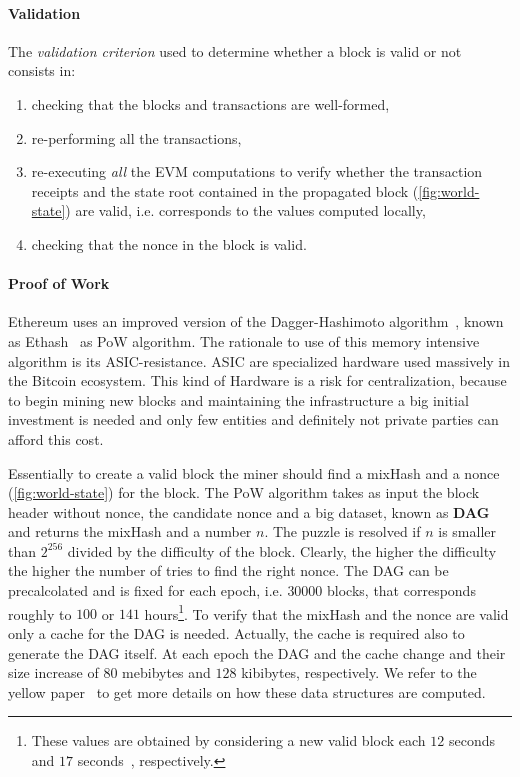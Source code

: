 \paragraph{Validation}
The \emph{validation criterion} used to determine whether a block is valid or
not consists in:
\begin{enumerate}
    \item checking that the blocks and transactions are well-formed,
    \item re-performing all the transactions,
    \item re-executing \emph{all} the EVM computations to verify whether the
    transaction receipts and the state root contained in the propagated block
    (\autoref{fig:world-state}) are valid, i.e. corresponds to the values
    computed locally,
    \item checking that the nonce in the block is valid.
\end{enumerate}

\paragraph{Proof of Work}
Ethereum uses an improved version of the
Dagger-Hashimoto algorithm~\cite{bib:dagger-hashimoto}, known as
Ethash~\cite[Appendix J]{wood2018ethereum} as PoW algorithm.
The rationale to use of this memory intensive algorithm is its
ASIC-resistance. ASIC are specialized hardware used massively in the Bitcoin
ecosystem. This kind of Hardware is a risk for centralization,
because to begin mining new blocks and maintaining the infrastructure a big
initial investment is needed and only few entities and definitely not private
parties can afford this cost.

Essentially to create a valid block the miner should find a mixHash and
a nonce (\autoref{fig:world-state}) for the block.
The PoW algorithm takes as input the block header without nonce,
the candidate nonce and a big dataset, known as \textbf{DAG} and
returns the mixHash and a number $n$. The puzzle is resolved if
$n$ is smaller than $2^{256}$ divided by the difficulty of the block. Clearly,
the higher the difficulty the higher the number of tries to find the
right nonce. The DAG can be precalcolated and is fixed for each epoch, i.e.
$30000$ blocks, that corresponds roughly to $100$ or $141$ hours\footnote{
These values are obtained by considering a new valid block each $12$
seconds~\cite{bib:} and $17$ seconds~\cite{bib:solidity}, respectively.}. To
verify that the mixHash and the nonce are valid only a cache for the DAG is
needed. Actually, the cache is required also to generate the DAG itself.
At each epoch the DAG and the cache change and their size increase of
$80$ mebibytes and $128$ kibibytes, respectively.
We refer to the yellow paper~\cite[Appendix J]{wood2018ethereum} to get more
details on how these data structures are computed.



